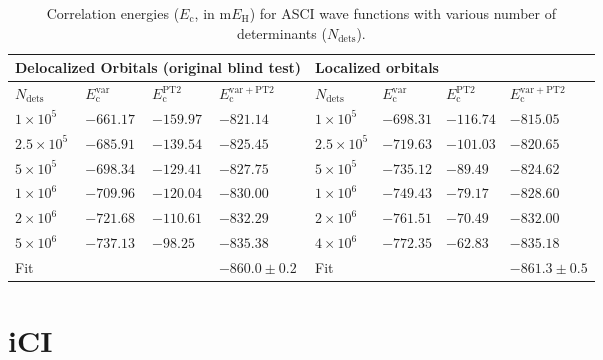 \documentclass[journal=jcp,manuscript=suppinfo]{achemso}
\begin{document}
\begin{table}[]
	\begin{tabular}{llll|llll}
		\toprule
		\multicolumn{4}{l}{Delocalized Orbitals (original blind test)} & \multicolumn{4}{l}{Localized orbitals}             \\\hline
		$N_\text{dets}$      & $E_{\mathrm{c}}^{\mathrm{var}}$    & $E_{\mathrm{c}}^{\mathrm{PT2}}$      & $E_{\mathrm{c}}^{\mathrm{var+PT2}}$    & $N_\text{dets}$    & $E_{\mathrm{c}}^{\mathrm{var}}$ & $E_{\mathrm{c}}^{\mathrm{PT2}}$   & $E_{\mathrm{c}}^{\mathrm{var+PT2}}$ \\
		\midrule\midrule
		$1\times10^5$  & $-661.17$        & $-159.97$    & $-821.14$            & $1\times10^5$ & $-698.31$     & $-116.74$ & $-815.05$         \\
		$2.5\times10^5$    & $-685.91$        & $-139.54$    & $-825.45$            & $2.5\times10^5$ & $-719.63$     & $-101.03$ & $-820.65$         \\
		$5\times10^5$    & $-698.34$        & $-129.41$    & $-827.75$            & $5\times10^5$ & $-735.12$     & $-89.49$  & $-824.62$         \\
		$1\times10^6$    & $-709.96$        & $-120.04$    & $-830.00$            & $1\times10^6$ & $-749.43$     & $-79.17$  & $-828.60$         \\
		$2\times10^6$    & $-721.68$        & $-110.61$    & $-832.29$            & $2\times10^6$ & $-761.51$     & $-70.49$  & $-832.00$         \\
		$5\times10^6$    & $-737.13$        & $-98.25$     & $-835.38$            & $4\times10^6$ & $-772.35$     & $-62.83$  & $-835.18$         \\\hline 
		Fit         &                &            & $-860.0\pm0.2$            & Fit      &             &         & $-861.3\pm0.5$ \\
		\midrule
	\end{tabular}
	\caption{Correlation energies  ($E_{\mathrm{c}}$, in m$E_{\text{H}}$) for ASCI wave functions with various number of determinants ($N_\text{dets}$).}
	\label{tab:ascidata}
	\vspace{-0.6cm}
\end{table}

\section{iCI}
\end{document}
